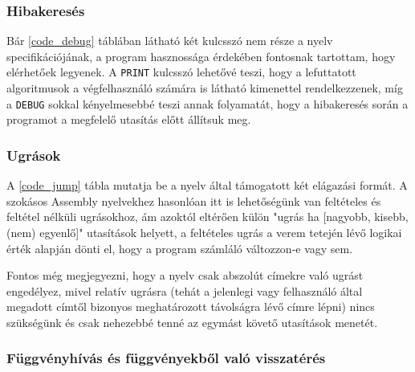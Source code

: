 \subsubsection{Hibakeresés}


Bár \ref{code_debug} táblában látható két kulcsszó nem része a nyelv specifikációjának, a program hasznossága érdekében fontosnak tartottam, hogy elérhetőek legyenek. A \texttt{PRINT} kulcsszó lehetővé teszi, hogy a lefuttatott algoritmusok a végfelhasználó számára is látható kimenettel rendelkezzenek, míg a \texttt{DEBUG} sokkal kényelmesebbé teszi annak folyamatát, hogy a hibakeresés során a programot a megfelelő utasítás előtt állítsuk meg. 

\subsubsection{Ugrások}

A \ref{code_jump} tábla mutatja be a nyelv által támogatott két elágazási formát. A szokásos Assembly nyelvekhez hasonlóan itt is lehetőségünk van feltételes és feltétel nélküli ugrásokhoz, ám azoktól eltérően külön "ugrás ha [nagyobb, kisebb, (nem) egyenlő]" utasítások helyett, a feltételes ugrás a verem tetején lévő logikai érték alapján dönti el, hogy a program számláló változzon-e vagy sem.


Fontos még megjegyezni, hogy a nyelv csak abszolút címekre való ugrást engedélyez, mivel relatív ugrásra (tehát a jelenlegi vagy felhasználó által megadott címtől bizonyos meghatározott távolságra lévő címre lépni) nincs szükségünk és csak nehezebbé tenné az egymást követő utasítások menetét.

\subsubsection{Függvényhívás és függvényekből való visszatérés}

